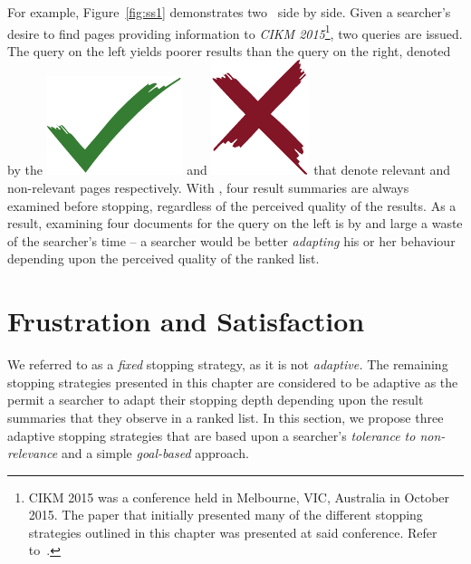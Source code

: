 For example, Figure~\ref{fig:ss1} demonstrates two~ side by side. Given a searcher's desire to find pages providing information to \emph{CIKM 2015}\footnote{CIKM 2015 was a conference held in Melbourne, VIC, Australia in October 2015. The paper that initially presented many of the different stopping strategies outlined in this chapter was presented at said conference. Refer to~\cite{maxwell2015stopping_strategies}.}, two queries are issued. The query on the left yields poorer results than the query on the right, denoted by the \includegraphics[height=\fontcharht\font`\d]{figures/ch0-tick.pdf} and \includegraphics[height=\fontcharht\font`\d]{figures/ch0-cross.pdf} that denote relevant and non-relevant pages respectively. With , four result summaries are always examined before stopping, regardless of the perceived quality of the results. As a result, examining four documents for the query on the left is by and large a waste of the searcher's time -- a searcher would be better \emph{adapting} his or her behaviour depending upon the perceived quality of the ranked list.

\section{Frustration and Satisfaction}\label{sec:strategies:frus_disg}
We  referred to as a \emph{fixed} stopping strategy, as it is not \emph{adaptive.} The remaining stopping strategies presented in this chapter are considered to be adaptive as the permit a searcher to adapt their stopping depth depending upon the result summaries that they observe in a ranked list. In this section, we propose three adaptive stopping strategies that are based upon a searcher's \emph{tolerance to non-relevance} and a simple \emph{goal-based} approach.

